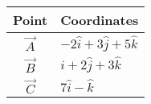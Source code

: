 \begin{tabular}{|c|p{3cm}|}
    \hline
    \textbf{Point} &\textbf{Coordinates} \\
    \hline
         $\vec{A}$ & $-2\hat{i}+3\hat{j}+5\hat{k}$  \\
    \hline
        $\vec{B}$ & $\hat{i}+2\hat{j}+3\hat{k}$ \\
    \hline
        $\vec{C}$ & $7\hat{i}-\hat{k}$ \\
    \hline
\end{tabular}